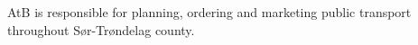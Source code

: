 AtB is responsible for planning, ordering and marketing public transport throughout Sør-Trøndelag county.

